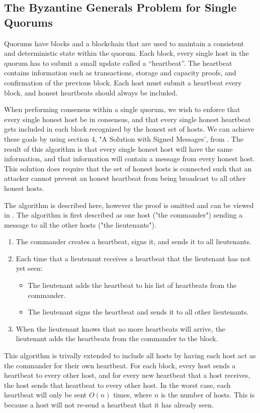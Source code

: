 \documentclass[twocolumn]{article}
\begin{document}
\subsection{The Byzantine Generals Problem for Single Quorums}
Quorums have blocks and a blockchain that are used to maintain a consistent and deterministic state within the quorum.
Each block, every single host in the quorum has to submit a small update called a ``heartbeat''.
The heartbeat contains information such as transactions, storage and capacity proofs, and confirmation of the previous block.
Each host must submit a heartbeat every block, and honest heartbeats should always be included.

When performing consensus within a single quorum, we wish to enforce that every single honest host be in consensus, and that every single honest heartbeat gets included in each block recognized by the honest set of hosts.
We can achieve these goals by using section 4, "A Solution with Signed Messages', from \cite{bgp}.
The result of this algorithm is that every single honest host will have the same information, and that information will contain a message from every honest host.
This solution does require that the set of honest hosts is connected such that an attacker cannot prevent an honest heartbeat from being broadcast to all other honest hosts.

The algorithm is described here, however the proof is omitted and can be viewed in \cite{bgp}.
The algorithm is first described as one host ("the commander") sending a message to all the other hosts ("the lieutenants").
\begin{enumerate}
	\item The commander creates a heartbeat, signs it, and sends it to all lieutenants.
	\item Each time that a lieutenant receives a heartbeat that the lieutenant has not yet seen:
	\begin{itemize}
		\item The lieutenant adds the heartbeat to his list of heartbeats from the commander.
		\item The lieutenant signs the heartbeat and sends it to all other lieutenants.
	\end{itemize}
	\item When the lieutenant knows that no more heartbeats will arrive, the lieutenant adds the heartbeats from the commander to the block.
\end{enumerate}

This algorithm is trivally extended to include all hosts by having each host act as the commander for their own heartbeat.
For each block, every host sends a heartbeat to every other host, and for every new heartbeat that a host receives, the host sends that heartbeat to every other host.
In the worst case, each heartbeat will only be sent $O(n)$ times, where $n$ is the number of hosts.
This is because a host will not re-send a heartbeat that it has already seen.
\end{document}
